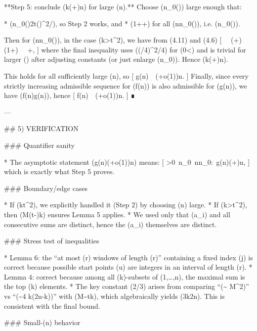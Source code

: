 **Step 5: conclude (k\le(+\varepsilon)n) for large (n).**
Choose (n_0(\varepsilon)) large enough that:

* (n_0(\varepsilon)\ge 2t(\varepsilon)^2/\varepsilon), so Step 2 works, and
* (1++) for all (n\ge n_0(\varepsilon)), i.e. (n_0(\varepsilon)\ge {}).

Then for (n\ge n_0(\varepsilon)), in the case (k>t^2), we have from (4.11) and (4.6)
[
\ \le\ \left(+\right)\left(1+\right)
\ \le\ +\varepsilon,
]
where the final inequality uses ((\varepsilon/4)^2\le \varepsilon/4) for (0<\varepsilon{}) and is trivial for larger (\varepsilon) after adjusting constants (or just enlarge (n_0)). Hence (k\le(+\varepsilon)n).

This holds for all sufficiently large (n), so
[
g(n)\ \le\ \Bigl(+o(1)\Bigr)n.
]
Finally, since every strictly increasing admissible sequence for (f(n)) is also admissible for (g(n)), we have (f(n)\le g(n)), hence
[
f(n)\ \le\ \Bigl(+o(1)\Bigr)n.
]
∎

---

## 5) VERIFICATION

### Quantifier sanity

* The asymptotic statement (g(n)\le(+o(1))n) means:
  [
  \forall \varepsilon>0\ \exists n_0\ \forall n\ge n_0:\ g(n)\le(+\varepsilon)n,
  ]
  which is exactly what Step 5 proves.

### Boundary/edge cases

* If (k\le t^2), we explicitly handled it (Step 2) by choosing (n) large.
* If (k>t^2), then (M\ge (t-)k) ensures Lemma 5 applies.
* We used only that (a_i) and all consecutive sums are distinct, hence the (a_i) themselves are distinct.

### Stress test of inequalities

* Lemma 6: the “at most (r) windows of length (r)” containing a fixed index (j) is correct because possible start points (u) are integers in an interval of length (r).
* Lemma 4: correct because among all (k)-subsets of ({1,\dots,n}), the maximal sum is the top (k) elements.
* The key constant (2/3) arises from comparing “(\sim {} M^2)” vs “(\sim {}4 k(2n-k))” with (M\sim tk), which algebraically yields (3k\lesssim 2n). This is consistent with the final bound.

### Small-(n) behavior

